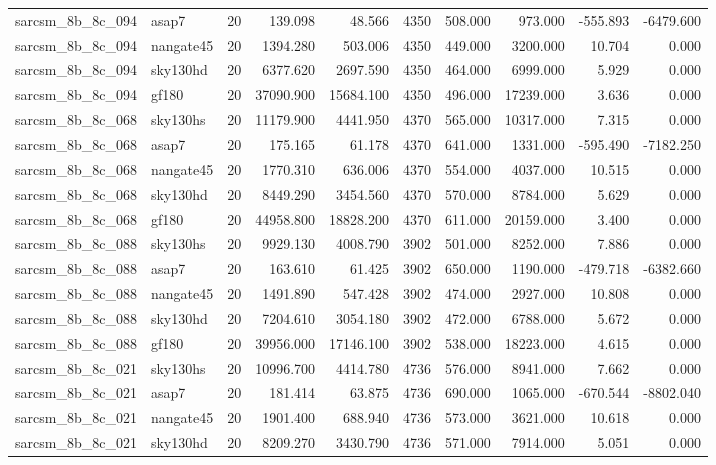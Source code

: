 \documentclass{article}
\begin{document}
\begin{longtable}{llrrrrrrrr}
sarcsm\_8b\_8c\_094 & asap7 & 20 & 139.098 & 48.566 & 4350 & 508.000 & 973.000 & -555.893 & -6479.600 \\
sarcsm\_8b\_8c\_094 & nangate45 & 20 & 1394.280 & 503.006 & 4350 & 449.000 & 3200.000 & 10.704 & 0.000 \\
sarcsm\_8b\_8c\_094 & sky130hd & 20 & 6377.620 & 2697.590 & 4350 & 464.000 & 6999.000 & 5.929 & 0.000 \\
sarcsm\_8b\_8c\_094 & gf180 & 20 & 37090.900 & 15684.100 & 4350 & 496.000 & 17239.000 & 3.636 & 0.000 \\
sarcsm\_8b\_8c\_068 & sky130hs & 20 & 11179.900 & 4441.950 & 4370 & 565.000 & 10317.000 & 7.315 & 0.000 \\
sarcsm\_8b\_8c\_068 & asap7 & 20 & 175.165 & 61.178 & 4370 & 641.000 & 1331.000 & -595.490 & -7182.250 \\
sarcsm\_8b\_8c\_068 & nangate45 & 20 & 1770.310 & 636.006 & 4370 & 554.000 & 4037.000 & 10.515 & 0.000 \\
sarcsm\_8b\_8c\_068 & sky130hd & 20 & 8449.290 & 3454.560 & 4370 & 570.000 & 8784.000 & 5.629 & 0.000 \\
sarcsm\_8b\_8c\_068 & gf180 & 20 & 44958.800 & 18828.200 & 4370 & 611.000 & 20159.000 & 3.400 & 0.000 \\
sarcsm\_8b\_8c\_088 & sky130hs & 20 & 9929.130 & 4008.790 & 3902 & 501.000 & 8252.000 & 7.886 & 0.000 \\
sarcsm\_8b\_8c\_088 & asap7 & 20 & 163.610 & 61.425 & 3902 & 650.000 & 1190.000 & -479.718 & -6382.660 \\
sarcsm\_8b\_8c\_088 & nangate45 & 20 & 1491.890 & 547.428 & 3902 & 474.000 & 2927.000 & 10.808 & 0.000 \\
sarcsm\_8b\_8c\_088 & sky130hd & 20 & 7204.610 & 3054.180 & 3902 & 472.000 & 6788.000 & 5.672 & 0.000 \\
sarcsm\_8b\_8c\_088 & gf180 & 20 & 39956.000 & 17146.100 & 3902 & 538.000 & 18223.000 & 4.615 & 0.000 \\
sarcsm\_8b\_8c\_021 & sky130hs & 20 & 10996.700 & 4414.780 & 4736 & 576.000 & 8941.000 & 7.662 & 0.000 \\
sarcsm\_8b\_8c\_021 & asap7 & 20 & 181.414 & 63.875 & 4736 & 690.000 & 1065.000 & -670.544 & -8802.040 \\
sarcsm\_8b\_8c\_021 & nangate45 & 20 & 1901.400 & 688.940 & 4736 & 573.000 & 3621.000 & 10.618 & 0.000 \\
sarcsm\_8b\_8c\_021 & sky130hd & 20 & 8209.270 & 3430.790 & 4736 & 571.000 & 7914.000 & 5.051 & 0.000 \\

\end{longtable}
\end{document}
